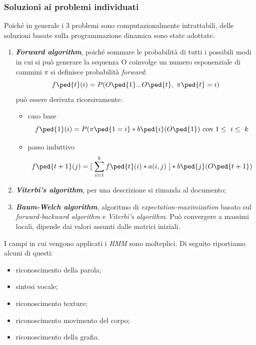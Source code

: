 \subsubsection*{Soluzioni ai problemi individuati\cite{8}}
\label{3.3.2.6}
Poiché in generale i 3 problemi sono computazionalmente intrattabili, delle soluzioni basate sulla \gls{programmazione dinamica} sono state adottate.
\begin{enumerate}
\item\textbf{\emph{Forward algorithm}}, poiché sommare le probabilità di tutti i possibili modi in cui si può generare la sequenza O coinvolge un numero esponenziale di cammini $\pi$ si definisce probabilità \emph{forward}:
\[ f\ped{t}(i)=P(O\ped{1}...O\ped{t},\ \pi\ped{t}=i)\]
può essere derivata ricorsivamente:
\begin{itemize}
\item caso base
\[f\ped{1}(i)=P(\pi\ped{1=i}*b\ped{i}(O\ped{1})\ con\ 1\le\ i\le\ k\]
\item passo induttivo
\[f\ped{t+1}(j)=[\ \sum\limits_{i=1}^k f\ped{t}(i)*a(i,j)\ ]*b\ped{j}(O\ped{t+1})\]
\end{itemize}
\item\textbf{\emph{Viterbi's algorithm}}, per una descrizione si rimanda al documento\cite{8};
\item\textbf{\emph{Baum-Welch algorithm}}, algoritmo di \emph{expectation-maximization} basato sul \emph{forward-backward algorithm} e \emph{Viterbi's algorithm}. Può convergere a massimi locali, dipende dai valori assunti dalle matrici iniziali.
\end{enumerate}
I campi in cui vengono applicati i \emph{HMM} sono molteplici. Di seguito riportiamo alcuni di questi:
\begin{itemize}
\item riconoscimento della parola;
\item sintesi vocale;
\item riconoscimento texture;
\item riconoscimento movimento del corpo;
\item riconoscimento della grafia.
\end{itemize}
